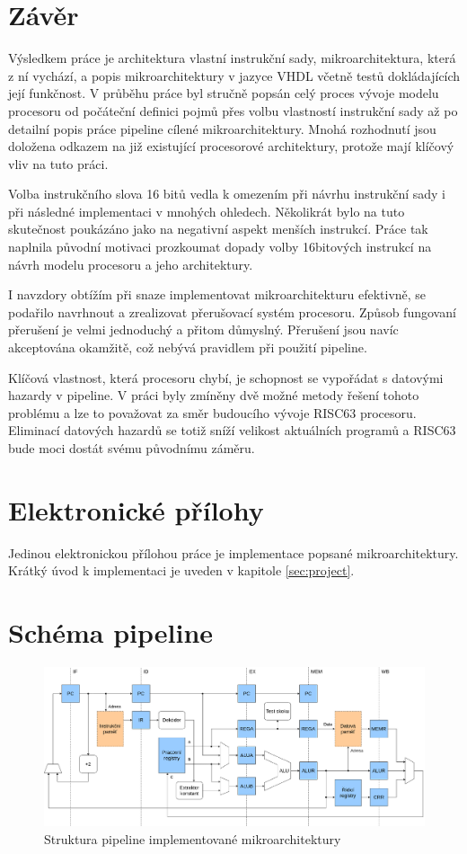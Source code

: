 \documentclass[
  digital, %
  color,   %
  table,   %
  twoside, %
  nolof,   %
  nolot,   %
]{fithesis3}
\begin{document}
\chapter*{Závěr}
Výsledkem práce je architektura vlastní instrukční sady, mikroarchitektura, která z ní vychází, a popis mikroarchitektury v jazyce VHDL včetně testů dokládajících její funkčnost. V průběhu práce byl stručně popsán celý proces vývoje modelu procesoru od počáteční definici pojmů přes volbu vlastností instrukční sady až po detailní popis práce pipeline cílené mikroarchitektury. Mnohá rozhodnutí jsou doložena odkazem na již existující procesorové architektury, protože mají klíčový vliv na tuto práci.

Volba instrukčního slova 16 bitů vedla k omezením při návrhu instrukční sady i při následné implementaci v mnohých ohledech. Několikrát bylo na tuto skutečnost poukázáno jako na negativní aspekt menších instrukcí. Práce tak naplnila původní motivaci prozkoumat dopady volby 16bitových instrukcí na návrh modelu procesoru a jeho architektury.

I navzdory obtížím při snaze implementovat mikroarchitekturu efektivně, se podařilo navrhnout a zrealizovat přerušovací systém procesoru. Způsob fungovaní přerušení je velmi jednoduchý a přitom důmyslný. Přerušení jsou navíc akceptována okamžitě, což nebývá pravidlem při použití pipeline.

Klíčová vlastnost, která procesoru chybí, je schopnost se vypořádat s datovými hazardy v pipeline. V práci byly zmíněny dvě možné metody řešení tohoto problému a lze to považovat za směr budoucího vývoje RISC63 procesoru. Eliminací datových hazardů se totiž sníží velikost aktuálních programů a RISC63 bude moci dostát svému původnímu záměru.

\printbibliography[heading=bibintoc] %
\appendix %
\chapter{Elektronické přílohy}
Jedinou elektronickou přílohou práce je implementace popsané mikroarchitektury. Krátký úvod k implementaci je uveden v kapitole \ref{sec:project}.

\chapter{Schéma pipeline}
\label{app:pipeline}
\begin{figure}[H]
  \begin{center}
    \includegraphics[height=0.5\textwidth, angle=-90]{img/risc63-pipeline}
  \end{center}
  \caption{Struktura pipeline implementované mikroarchitektury}
\end{figure}
\end{document}
